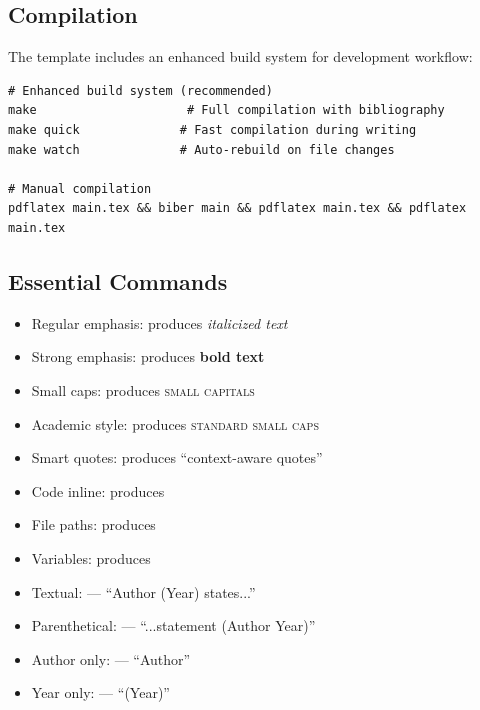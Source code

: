 \documentclass[11pt]{article}
\begin{document}
\subsection{Compilation}

The template includes an enhanced build system for development workflow:

\begin{verbatim}
# Enhanced build system (recommended)
make                     # Full compilation with bibliography
make quick              # Fast compilation during writing  
make watch              # Auto-rebuild on file changes

# Manual compilation  
pdflatex main.tex && biber main && pdflatex main.tex && pdflatex main.tex
\end{verbatim}

\subsection{Essential Commands}

\begin{itemize}
\item Regular emphasis:  produces \emph{italicized text}
\item Strong emphasis:  produces \textbf{bold text}
\item Small caps:  produces \textsc{small capitals}
\item Academic style:  produces \textsc{standard small caps}
\end{itemize}

\begin{itemize}
\item Smart quotes:  produces \enquote{context-aware quotes}
\item Code inline:  produces 
\item File paths:  produces 
\item Variables:  produces 
\end{itemize}

\begin{itemize}
\item Textual:  --- \enquote{Author (Year) states...}
\item Parenthetical:  --- \enquote{...statement (Author Year)}
\item Author only:  --- \enquote{Author}
\item Year only:  --- \enquote{(Year)}
\end{itemize}
\end{document}
